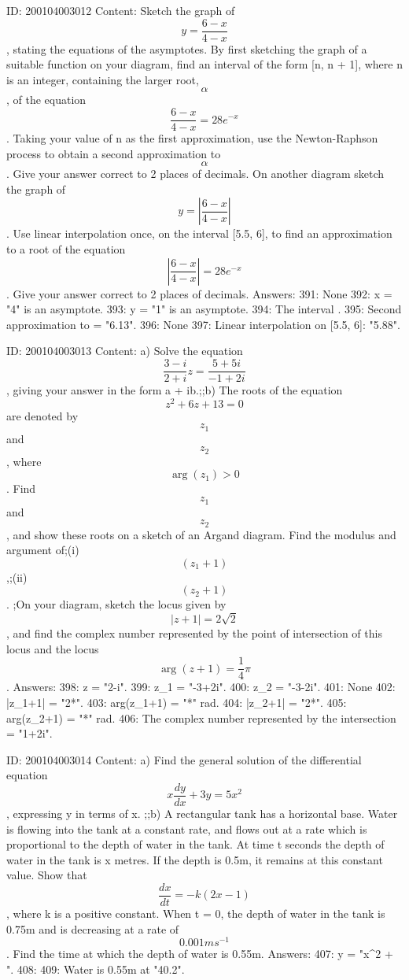 \documentclass{article}
\begin{document}
ID: 200104003012
Content:
Sketch the graph of  $$y = \frac{6 - x}{4 - x}$$, stating the equations of the asymptotes. By first sketching the graph of a suitable function on your diagram, find an interval of the form [n, n + 1], where n is an integer, containing the larger root,  $$\alpha $$, of the equation  $$\frac{6 - x}{4 - x} = 28e^{- x} $$. Taking your value of n as the first approximation, use the Newton-Raphson process to obtain a second approximation to  $$\alpha $$. Give your answer correct to 2 places of decimals. On another diagram sketch the graph of  $$y = \left| \frac{6 - x}{4 - x} \right|$$. Use linear interpolation once, on the interval [5.5, 6], to find an approximation to a root of the equation  $$\left| \frac{6 - x}{4 - x}\right| = 28e^{- x}$$. Give your answer correct to 2 places of decimals.  Answers:
391: None
392: x = "4" is an asymptote.
393: y = "1" is an asymptote.
394: The interval \alpha \in ["6","7"].
395: Second approximation to \alpha = "6.13".
396: None
397: Linear interpolation on [5.5, 6]: \beta \approx "5.88".

ID: 200104003013
Content:
a)  Solve the equation  $$\frac{3 - i}{2 + i}z = \frac{5 + 5i}{- 1 + 2i}$$, giving your answer in the form a + ib.;;b) The roots of the equation  $$z^2  + 6z + 13 = 0$$ are denoted by  $$z_1 $$ and  $$z_2 $$, where  $$\arg ( z_1  ) > 0$$. Find  $$z_1 $$ and  $$z_2 $$, and show these roots on a sketch of an Argand diagram. Find the modulus and argument of;(i)  $$( z_1  + 1 )$$,;(ii)  $$( z_2  + 1 )$$. ;On your diagram, sketch the locus given by  $$| z + 1 | = 2\sqrt 2 $$, and find the complex number represented by the point of intersection of this locus and the locus  $$\arg ( z + 1 ) = \frac{1}{4}\pi $$. Answers:
398: z = "2-i".
399: z_1 = "-3+2i".
400: z_2 = "-3-2i".
401: None
402: |z_1+1| = "2*".
403: arg(z_1+1) = "*\pi" rad.
404: |z_2+1| = "2*".
405: arg(z_2+1) = "*\pi" rad.
406: The complex number represented by the intersection = "1+2i".

ID: 200104003014
Content:
a)  Find the general solution of the differential equation  $$x\frac{dy}{dx} + 3y = 5x^2 $$, expressing y in terms of x. ;;b) A rectangular tank has a horizontal base. Water is flowing into the tank at a constant rate, and flows out at a rate which is proportional to the depth of water in the tank. At time t seconds the depth of water in the tank   is x metres. If the depth is 0.5m, it remains at this constant value. Show that $$ \frac{dx}{dt} =  - k( 2x - 1 )$$, where k is a positive constant. When t = 0, the depth of water in the tank is 0.75m and is decreasing at a rate of  $$0.001ms^{- 1}$$. Find the time at which the depth of water is 0.55m.  Answers:
407: y = "x^2 + ".
408: 
409: Water is 0.55m at "40.2".
\end{document}

